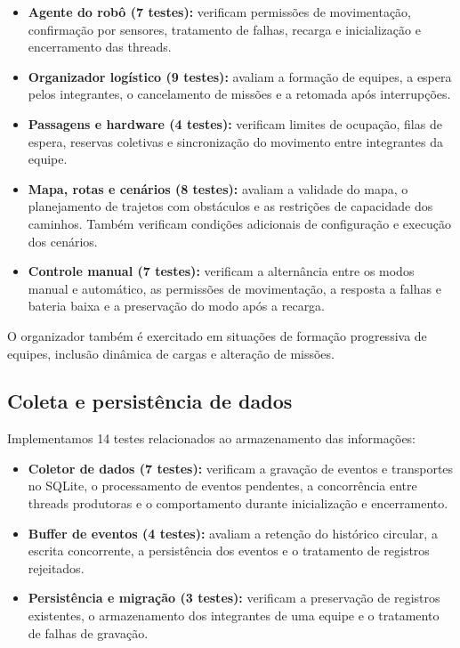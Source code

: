 \documentclass[12pt,a4paper]{article}
\begin{document}
\begin{itemize}
    \item \textbf{Agente do robô (7 testes):} verificam permissões de movimentação, confirmação por sensores, tratamento de falhas, recarga e inicialização e encerramento das threads.

    \item \textbf{Organizador logístico (9 testes):} avaliam a formação de equipes, a espera pelos integrantes, o cancelamento de missões e a retomada após interrupções.

    \item \textbf{Passagens e hardware (4 testes):} verificam limites de ocupação, filas de espera, reservas coletivas e sincronização do movimento entre integrantes da equipe.

    \item \textbf{Mapa, rotas e cenários (8 testes):} avaliam a validade do mapa, o planejamento de trajetos com obstáculos e as restrições de capacidade dos caminhos. Também verificam condições adicionais de configuração e execução dos cenários.

    \item \textbf{Controle manual (7 testes):} verificam a alternância entre os modos manual e automático, as permissões de movimentação, a resposta a falhas e bateria baixa e a preservação do modo após a recarga.
\end{itemize}

O organizador também é exercitado em situações de formação progressiva de
equipes, inclusão dinâmica de cargas e alteração de missões.

\subsection{Coleta e persistência de dados}

Implementamos 14 testes relacionados ao armazenamento das informações:

\begin{itemize}
    \item \textbf{Coletor de dados (7 testes):} verificam a gravação de eventos e transportes no SQLite, o processamento de eventos pendentes, a concorrência entre threads produtoras e o comportamento durante inicialização e encerramento.

    \item \textbf{Buffer de eventos (4 testes):} avaliam a retenção do histórico circular, a escrita concorrente, a persistência dos eventos e o tratamento de registros rejeitados.

    \item \textbf{Persistência e migração (3 testes):} verificam a preservação de registros existentes, o armazenamento dos integrantes de uma equipe e o tratamento de falhas de gravação.
\end{itemize}
\end{document}
